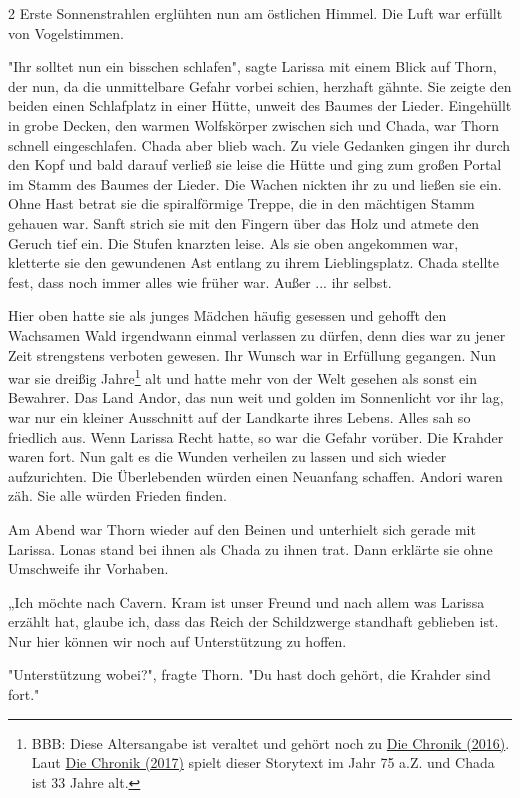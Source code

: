 \documentclass[10pt, a4paper, oneside]{book}
\begin{document}
\begin{multicols}{2}
Erste Sonnenstrahlen erglühten nun am östlichen Himmel. Die Luft war erfüllt von Vogelstimmen.

"Ihr solltet nun ein bisschen schlafen", sagte Larissa mit einem Blick auf Thorn, der nun, da die unmittelbare Gefahr vorbei schien, herzhaft gähnte. Sie zeigte den beiden einen Schlafplatz in einer Hütte, unweit des Baumes der Lieder. Eingehüllt in grobe Decken, den warmen Wolfskörper zwischen sich und Chada, war Thorn schnell eingeschlafen. Chada aber blieb wach. Zu viele Gedanken gingen ihr durch den Kopf und bald darauf verließ sie leise die Hütte und ging zum großen Portal im Stamm des Baumes der Lieder. Die Wachen nickten ihr zu und ließen sie ein. Ohne Hast betrat sie die spiralförmige Treppe, die in den mächtigen Stamm gehauen war. Sanft strich sie mit den Fingern über das Holz und atmete den Geruch tief ein. Die Stufen knarzten leise. Als sie oben angekommen war, kletterte sie den gewundenen Ast entlang zu ihrem Lieblingsplatz. Chada stellte fest, dass noch immer alles wie früher war. Außer ... ihr selbst.

Hier oben hatte sie als junges Mädchen häufig gesessen und gehofft den Wachsamen Wald irgendwann einmal verlassen zu dürfen, denn dies war zu jener Zeit strengstens verboten gewesen. Ihr Wunsch war in Erfüllung gegangen. Nun war sie dreißig Jahre\footnote{BBB: Diese Altersangabe ist veraltet und gehört noch zu \hyperref[produkt-2016-die-chronik]{Die Chronik (2016)}. Laut \hyperref[produkt-2017-die-chronik]{Die Chronik (2017)} spielt dieser Storytext im Jahr 75 a.Z. und Chada ist 33 Jahre alt.} alt und hatte mehr von der Welt gesehen als sonst ein Bewahrer. Das Land Andor, das nun weit und golden im Sonnenlicht vor ihr lag, war nur ein kleiner Ausschnitt auf der Landkarte ihres Lebens. Alles sah so friedlich aus. Wenn Larissa Recht hatte, so war die Gefahr vorüber. Die Krahder waren fort. Nun galt es die Wunden verheilen zu lassen und sich wieder aufzurichten. Die Überlebenden würden einen Neuanfang schaffen. Andori waren zäh. Sie alle würden Frieden finden.

Am Abend war Thorn wieder auf den Beinen und unterhielt sich gerade mit Larissa. Lonas stand bei ihnen als Chada zu ihnen trat.  Dann erklärte sie ohne Umschweife ihr Vorhaben.

„Ich möchte nach Cavern. Kram ist unser Freund und nach allem was Larissa erzählt hat, glaube ich, dass das Reich der Schildzwerge standhaft geblieben ist. Nur hier können wir noch auf Unterstützung zu hoffen.

"Unterstützung wobei?", fragte Thorn. "Du hast doch gehört, die Krahder sind fort."


\end{multicols}
\end{document}
